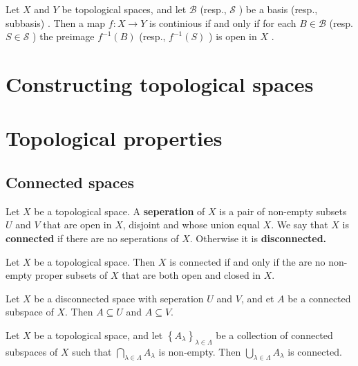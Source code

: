 \documentclass{article}
\theoremstyle{remark}
\begin{document}
\begin{theorem}
    Let $X$ and $Y$ be topological spaces, and let $ \mathscr{B} $ (resp., $\mathscr{S} $ ) be a basis (resp.,
    subbasis) . Then a map $f: X \to Y  $ is continious if and only if for each $B \in \mathscr{B} $ (resp. $S \in
    \mathscr{S} $ ) the preimage $f^{-1} \left( B \right)$ (resp., $f^{-1} \left( S \right)$ ) is open in $X$   .
\end{theorem}

\section{ Constructing topological spaces}%
\label{sec:chapter_5_constructing_topological_spaces}

\section{ Topological properties}%
\label{sec:chapter_6_topological_properties}

\subsection{Connected spaces}%
\label{sub:connected_spaces}


\begin{definition}
Let $X$ be a topological space. A \textbf{seperation} of $X$ is a pair of non-empty subsets $U $ and $V$ that are open
in $X$, disjoint and whose union equal $X$. We say that $X$ is \textbf{connected} if there are no seperations of $X$.
Otherwise it is \textbf{disconnected.}
\end{definition}

\begin{theorem}
    Let $X$ be a topological space. Then $X$ is connected if and only if the are no non-empty proper subsets of $X$ that
    are both open and closed in $X$.

\end{theorem}

\begin{lemma}[Disconnectivity]
    Let $X$ be a disconnected space with seperation $U$ and $V$,  and et $A$ be a connected subspace of $X$. Then $A
    \subseteq U$ and $A \subseteq  V$.

\end{lemma}

\begin{theorem}
    Let $X$ be a topological space,  and let $\left\{ A_{\lambda } \right\}_{\lambda \in \Lambda }$ be a collection of
    connected subspaces of $X$ such that $ \bigcap_{\lambda  \in \Lambda } A_{\lambda }$ is non-empty. Then $\bigcup
    _{\lambda \in  \Lambda } A_{\lambda }$ is connected.

\end{theorem}
\end{document}
